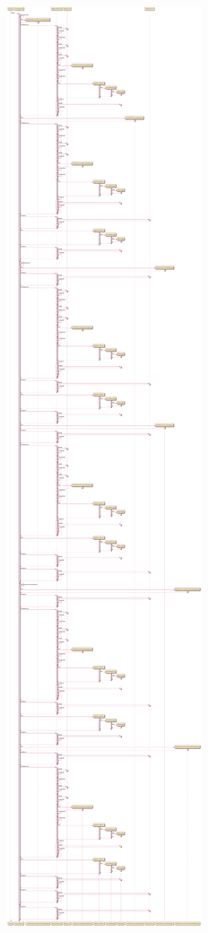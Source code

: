 \includegraphics[width=\textwidth,height=\textheight,keepaspectratio]{Schemas/InvoiceServlet_doGet.svg.pdf}

